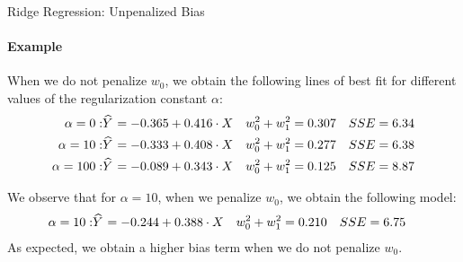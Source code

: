 %
%
%
\begin{frame}{Ridge Regression: Unpenalized Bias}
\framesubtitle{Example}
When we do not penalize
    $w_0$, we obtain the following 
    lines of best
    fit for different values of the regularization constant $\alpha$:
    \begin{align*}
        \alpha = 0: & \mkern 1.5mu\widehat{\mkern-1.5muY}\mkern 1.5mu = -0.365 + 0.416 \cdot X 
        & w_0^2+w_1^2 & = 0.307 
        & SSE & = 6.34\\
        \alpha = 10: & \mkern 1.5mu\widehat{\mkern-1.5muY}\mkern 1.5mu = -0.333 + 0.408 \cdot X
        & w_0^2 +w_1^2 & = 0.277
       & SSE & = 6.38 \\
       \alpha = 100: & \mkern 1.5mu\widehat{\mkern-1.5muY}\mkern 1.5mu = -0.089 + 0.343 \cdot X
       & w_0^2+w_1^2 & = 0.125
       & SSE & = 8.87
    \end{align*}

We observe that for $\alpha=10$,
    when we penalize $w_0$, we obtain the following model:
    \begin{align*}
        \alpha = 10: & \mkern 1.5mu\widehat{\mkern-1.5muY}\mkern 1.5mu = -0.244 + 0.388 \cdot X
        & w_0^2+w_1^2 & = 0.210
       & SSE & = 6.75
    \end{align*}
    As expected, we obtain a higher bias term when we
    do not penalize $w_0$.

\end{frame}
%
